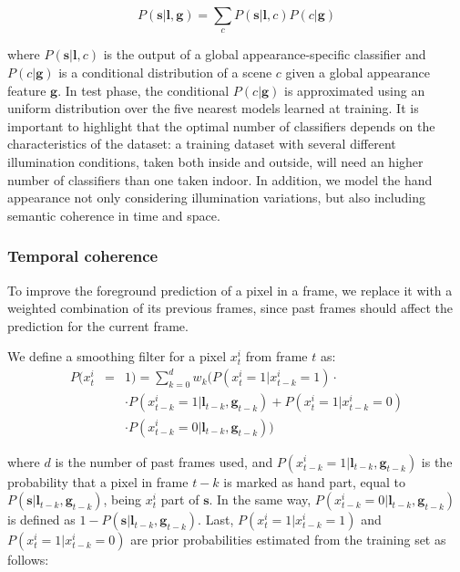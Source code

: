 \documentclass[11pt, oneside]{Thesis} %
\begin{document}
\begin{equation}
P(\mathbf{s}|\mathbf{l},\mathbf{g})=\sum_{c}P(\mathbf{s}|\mathbf{l},c)P(c|\mathbf{g})
\end{equation}


where $P(\mathbf{s}|\mathbf{l},c)$ is the output of a global appearance-specific
classifier and $P(c|\mathbf{g})$ is a conditional distribution of a
scene $c$ given a global appearance feature $\mathbf{g}$. In test
phase, the conditional $P(c|\mathbf{g})$ is approximated using an
uniform distribution over the five nearest models learned at training.
It is important to highlight that the optimal number of classifiers
depends on the characteristics of the dataset: a training dataset
with several different illumination conditions, taken both inside and
outside, will need an higher number of classifiers than one taken indoor.
In addition, we model the hand appearance not
only considering illumination variations, but also including semantic coherence in time and space.


\subsubsection{Temporal coherence}

To improve the foreground prediction of a pixel in a frame, we replace it with a weighted combination of its previous frames,
since past frames should affect the prediction for the current frame.

We define a smoothing filter for a pixel $x_{t}^{i}$ from frame $t$ as:
\begin{eqnarray}
P(x_{t}^{i} & = & 1)=\sum_{k=0}^{d}w_{k}(P(x_{t}^{i}=1|x_{t-k}^{i}=1)\cdot\nonumber \\
 &  & \cdot P(x_{t-k}^{i}=1|\mathbf{l}_{t-k},\mathbf{g}_{t-k})+P(x_{t}^{i}=1|x_{t-k}^{i}=0)\nonumber \\
 &  & \cdot P(x_{t-k}^{i}=0|\mathbf{l}_{t-k},\mathbf{g}_{t-k}))
\end{eqnarray}


where $d$ is the number of past frames used, and $P(x_{t-k}^{i}=1|\mathbf{l}_{t-k},\mathbf{g}_{t-k})$
is the probability that a pixel in frame $t-k$ is marked as hand
part, equal to $P(\mathbf{s}|\mathbf{l}_{t-k},\mathbf{g}_{t-k})$,
being $x_{t}^{i}$ part of $\mathbf{s}$. In the same way, $P(x_{t-k}^{i}=0|\mathbf{l}_{t-k},\mathbf{g}_{t-k})$
is defined as $1-P(\mathbf{s}|\mathbf{l}_{t-k},\mathbf{g}_{t-k})$.
Last, $P(x_{t}^{i}=1|x_{t-k}^{i}=1)$ and $P(x_{t}^{i}=1|x_{t-k}^{i}=0)$
are prior probabilities estimated from the training set as follows:
\end{document}
